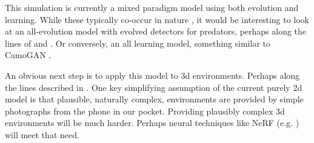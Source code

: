 \documentclass[letterpaper]{article}
\begin{document}
\par
This simulation is currently a mixed paradigm model using both evolution and learning. While these typically co-occur in nature \cite{valiant_probably_2013}, it would be interesting to look at an all-evolution model with evolved detectors for predators, perhaps along the lines of \citet{harrington_coevolution_2014} and \citet{bi_genetic_2022}. Or conversely, an all learning model, something similar to CamoGAN \cite{talas_camogan_2020}.
\par
An obvious next step is to apply this model to 3d environments. Perhaps along the lines described in \citet{miller_color_2022}. One key simplifying assumption of the current purely 2d model is that plausible, naturally complex, environments are provided by simple photographs from the phone in our pocket. Providing plausibly complex 3d environments will be much harder. Perhaps neural techniques like NeRF (e.g. \cite{gao_nerf_2022}) will meet that need.
\par

\end{document}
